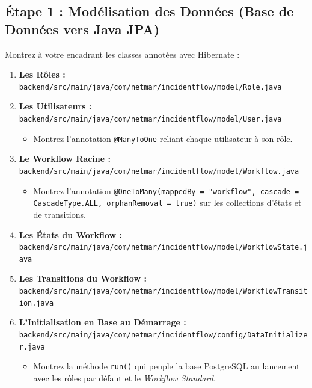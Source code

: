 \documentclass[11pt,a4paper]{article}
\begin{document}
\subsection{Étape 1 : Modélisation des Données (Base de Données vers Java JPA)}
Montrez à votre encadrant les classes annotées avec Hibernate :
\begin{enumerate}
    \item \textbf{Les Rôles :} \texttt{backend/src/main/java/com/netmar/incidentflow/model/Role.java}
    \item \textbf{Les Utilisateurs :} \texttt{backend/src/main/java/com/netmar/incidentflow/model/User.java}
    \begin{itemize}
        \item Montrez l'annotation \texttt{@ManyToOne} reliant chaque utilisateur à son rôle.
    \end{itemize}
    \item \textbf{Le Workflow Racine :} \texttt{backend/src/main/java/com/netmar/incidentflow/model/Workflow.java}
    \begin{itemize}
        \item Montrez l'annotation \texttt{@OneToMany(mappedBy = "workflow", cascade = CascadeType.ALL, orphanRemoval = true)} sur les collections d'états et de transitions.
    \end{itemize}
    \item \textbf{Les États du Workflow :} \texttt{backend/src/main/java/com/netmar/incidentflow/model/WorkflowState.java}
    \item \textbf{Les Transitions du Workflow :} \texttt{backend/src/main/java/com/netmar/incidentflow/model/WorkflowTransition.java}
    \item \textbf{L'Initialisation en Base au Démarrage :} \texttt{backend/src/main/java/com/netmar/incidentflow/config/DataInitializer.java}
    \begin{itemize}
        \item Montrez la méthode \texttt{run()} qui peuple la base PostgreSQL au lancement avec les rôles par défaut et le \textit{Workflow Standard}.
    \end{itemize}
\end{enumerate}
\end{document}

